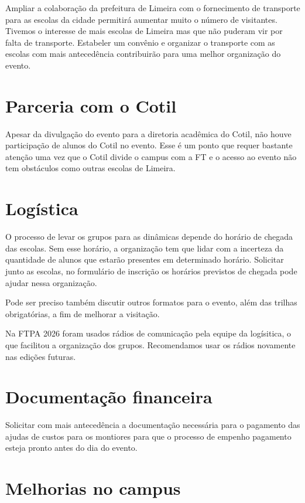 \documentclass[
  letterpaper,
  DIV=11,
  numbers=noendperiod]{scrreprt}
\begin{document}
Ampliar a colaboração da prefeitura de Limeira com o fornecimento de
transporte para as escolas da cidade permitirá aumentar muito o número
de visitantes. Tivemos o interesse de mais escolas de Limeira mas que
não puderam vir por falta de transporte. Estabeler um convênio e
organizar o transporte com as escolas com mais antecedência contribuirão
para uma melhor organização do evento.

\section{Parceria com o Cotil}\label{parceria-com-o-cotil-1}

Apesar da divulgação do evento para a diretoria acadêmica do Cotil, não
houve participação de alunos do Cotil no evento. Esse é um ponto que
requer bastante atenção uma vez que o Cotil divide o campus com a FT e o
acesso ao evento não tem obstáculos como outras escolas de Limeira.

\section{Logística}\label{loguxedstica-1}

O processo de levar os grupos para as dinâmicas depende do horário de
chegada das escolas. Sem esse horário, a organização tem que lidar com a
incerteza da quantidade de alunos que estarão presentes em determinado
horário. Solicitar junto as escolas, no formulário de inscrição os
horários previstos de chegada pode ajudar nessa organização.

Pode ser preciso também discutir outros formatos para o evento, além das
trilhas obrigatórias, a fim de melhorar a visitação.

Na FTPA 2026 foram usados rádios de comunicação pela equipe da
logísitica, o que facilitou a organização dos grupos. Recomendamos usar
os rádios novamente nas edições futuras.

\section{Documentação financeira}\label{documentauxe7uxe3o-financeira-1}

Solicitar com mais antecedência a documentação necessária para o
pagamento das ajudas de custos para os montiores para que o processo de
empenho pagamento esteja pronto antes do dia do evento.

\section{Melhorias no campus}\label{melhorias-no-campus-1}
\end{document}
